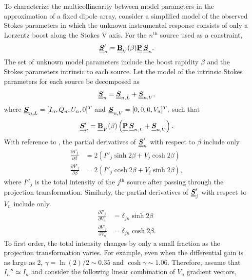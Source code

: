 To characterize the multicollinearity between model parameters in the approximation of a fixed dipole array, consider a simplified model of the observed Stokes
parameters in which the unknown instrumental response consists of only a Lorzentz boost along the Stokes V axis.  For the $n^\mathrm{th}$ source used as a constraint,
%
\begin{equation}
    \underline{\underline{\mbox{\boldmath $S$}}}'_n = \underline{\underline{{\bf B}}}_V(\beta) \underline{\underline{{\bf P}}} \, \underline{\underline{\mbox{\boldmath $S$}}}_n.
\end{equation}
%
The set of unknown model parameters include the boost rapidity $\beta$ and the Stokes parameters intrinsic to each source.
%
Let the model of the intrinsic Stokes parameters for each source be decomposed as
\begin{equation}
    \underline{\underline{\mbox{\boldmath $S$}}}_n = \underline{\underline{\mbox{\boldmath $S$}}}_{n,L} + \underline{\underline{\mbox{\boldmath $S$}}}_{n,V},
\end{equation}
where $\underline{\underline{\mbox{\boldmath $S$}}}_{n,L}=[I_n,Q_n,U_n,0]^T$ and $\underline{\underline{\mbox{\boldmath $S$}}}_{n,V}=[0,0,0,V_n]^T$,
such that
\begin{equation}
    \underline{\underline{\mbox{\boldmath $S$}}}'_n = \underline{\underline{{\bf B}}}_V(\beta) \left( \underline{\underline{{\bf P}}} \,  \underline{\underline{\mbox{\boldmath $S$}}}_{n,L} +  \underline{\underline{\mbox{\boldmath $S$}}}_{n,V} \right).
\end{equation}
%
With reference to ,
the partial derivatives of $\underline{\underline{\mbox{\boldmath $S$}}}'_n$ with respect
to $\beta$ include only
%
\begin{equation}
\begin{split}
\frac{\partial I'_j}{\partial\beta} &= 2 \left( I''_j \sinh 2\beta + V_j \cosh 2\beta \right) \\
\frac{\partial V'_j}{\partial\beta} &= 2 \left( I''_j \cosh 2\beta + V_j \sinh 2\beta \right), \label{eqn:partial_beta}
\end{split}
\end{equation}
where $I''_j$ is the total intensity of the $j^\mathrm{th}$ source after passing through the projection transformation.
%
Similarly, the partial derivatives of $\underline{\underline{\mbox{\boldmath $S$}}}'_j$ with respect
to $V_n$ include only
%
\begin{equation}
\begin{split}
\frac{\partial I'_j}{\partial V_n} &= \delta_{jn} \sinh 2\beta  \\
\frac{\partial V'_j}{\partial V_n} &= \delta_{jn} \cosh 2\beta.
\end{split}
\end{equation}
%
To first order, the total intensity changes by only a small fraction as the projection transformation varies.  For example, even when the differential gain is as large as 2, $\gamma = \ln(2)/2 \sim 0.35$  and $\cosh\gamma \sim 1.06$.
%
Therefore, assume that $I_n''\simeq I_n$ and consider the following linear combination of $V_n$ gradient vectors,
